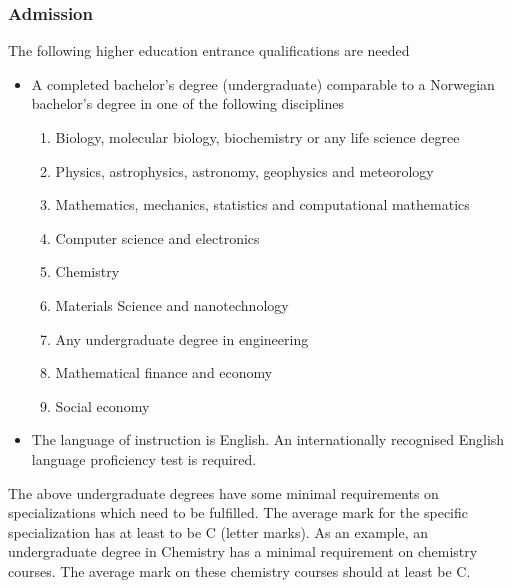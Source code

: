 \documentclass{beamer}
\begin{document}
\begin{frame}
\frametitle{Admission}

\begin{block}{}
The following higher education entrance qualifications are needed

\begin{itemize}
\item A completed bachelor's degree (undergraduate) comparable to a Norwegian bachelor's degree in one of the following disciplines
\begin{enumerate}

 \item Biology, molecular biology, biochemistry  or any life science degree

 \item Physics, astrophysics, astronomy, geophysics and meteorology

 \item Mathematics, mechanics, statistics and computational mathematics

 \item Computer science and electronics

 \item Chemistry

 \item Materials Science and nanotechnology

 \item Any undergraduate degree in engineering

 \item Mathematical finance and economy

 \item Social economy

\end{enumerate}

\noindent
\item The language of instruction is English. An internationally recognised English language proficiency test is required.
\end{itemize}

\noindent
The above undergraduate degrees have some minimal requirements on specializations which need to be fulfilled.  The average mark
for the specific specialization has at least to be C (letter marks).
As an example, an undergraduate degree in Chemistry has a minimal requirement on chemistry courses. The average mark on these chemistry courses should
at least be C.

\end{block}
\end{frame}
\end{document}
